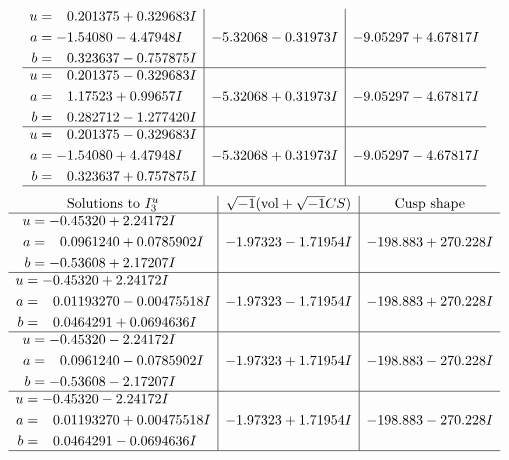 \documentclass[1p]{elsarticle_modified}
\theoremstyle{definition}
\newcommand{\I}{\sqrt{-1}}
\begin{document}
$$\begin{array}{c|c|c}
\begin{aligned}
u &= \phantom{-}0.201375 + 0.329683 I \\
a &= -1.54080 - 4.47948 I \\
b &= \phantom{-}0.323637 - 0.757875 I\end{aligned}
 & -5.32068 - 0.31973 I & -9.05297 + 4.67817 I \\ \hline\begin{aligned}
u &= \phantom{-}0.201375 - 0.329683 I \\
a &= \phantom{-}1.17523 + 0.99657 I \\
b &= \phantom{-}0.282712 - 1.277420 I\end{aligned}
 & -5.32068 + 0.31973 I & -9.05297 - 4.67817 I \\ \hline\begin{aligned}
u &= \phantom{-}0.201375 - 0.329683 I \\
a &= -1.54080 + 4.47948 I \\
b &= \phantom{-}0.323637 + 0.757875 I\end{aligned}
 & -5.32068 + 0.31973 I & -9.05297 - 4.67817 I\\
 \hline 
 \end{array}$$\newpage$$\begin{array}{c|c|c}  
\text{Solutions to }I^u_{3}& \I (\text{vol} + \sqrt{-1}CS) & \text{Cusp shape}\\
 \hline 
\begin{aligned}
u &= -0.45320 + 2.24172 I \\
a &= \phantom{-}0.0961240 + 0.0785902 I \\
b &= -0.53608 + 2.17207 I\end{aligned}
 & -1.97323 - 1.71954 I & -198.883 + 270.228 I \\ \hline\begin{aligned}
u &= -0.45320 + 2.24172 I \\
a &= \phantom{-}0.01193270 - 0.00475518 I \\
b &= \phantom{-}0.0464291 + 0.0694636 I\end{aligned}
 & -1.97323 - 1.71954 I & -198.883 + 270.228 I \\ \hline\begin{aligned}
u &= -0.45320 - 2.24172 I \\
a &= \phantom{-}0.0961240 - 0.0785902 I \\
b &= -0.53608 - 2.17207 I\end{aligned}
 & -1.97323 + 1.71954 I & -198.883 - 270.228 I \\ \hline\begin{aligned}
u &= -0.45320 - 2.24172 I \\
a &= \phantom{-}0.01193270 + 0.00475518 I \\
b &= \phantom{-}0.0464291 - 0.0694636 I\end{aligned}
 & -1.97323 + 1.71954 I & -198.883 - 270.228 I\\
 \hline 
 \end{array}$$\newpage\newpage\renewcommand{\arraystretch}{1}
\end{document}
